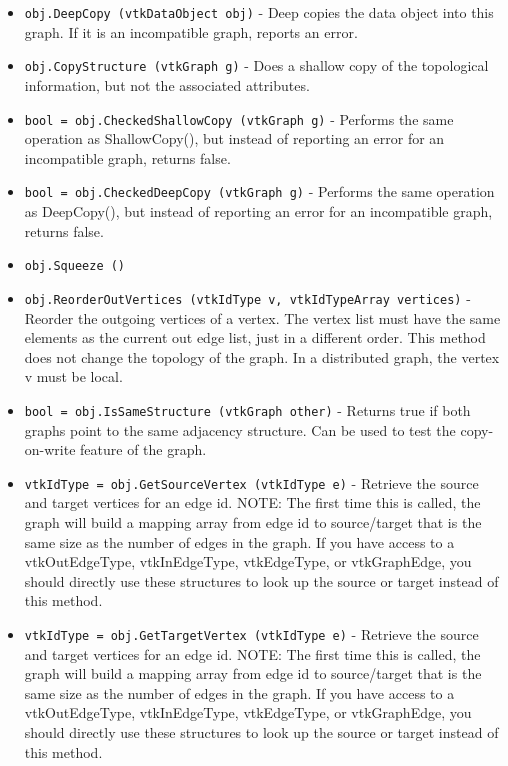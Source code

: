 \begin{itemize}
\item  \verb|obj.DeepCopy (vtkDataObject obj)| -  Deep copies the data object into this graph.
 If it is an incompatible graph, reports an error.

\item  \verb|obj.CopyStructure (vtkGraph g)| -  Does a shallow copy of the topological information,
 but not the associated attributes.

\item  \verb|bool = obj.CheckedShallowCopy (vtkGraph g)| -  Performs the same operation as ShallowCopy(),
 but instead of reporting an error for an incompatible graph,
 returns false.

\item  \verb|bool = obj.CheckedDeepCopy (vtkGraph g)| -  Performs the same operation as DeepCopy(),
 but instead of reporting an error for an incompatible graph,
 returns false.

\item  \verb|obj.Squeeze ()|

\item  \verb|obj.ReorderOutVertices (vtkIdType v, vtkIdTypeArray vertices)| -  Reorder the outgoing vertices of a vertex.
 The vertex list must have the same elements as the current out edge
 list, just in a different order.
 This method does not change the topology of the graph.
 In a distributed graph, the vertex v must be local.

\item  \verb|bool = obj.IsSameStructure (vtkGraph other)| -  Returns true if both graphs point to the same adjacency structure.
 Can be used to test the copy-on-write feature of the graph.

\item  \verb|vtkIdType = obj.GetSourceVertex (vtkIdType e)| -  Retrieve the source and target vertices for an edge id.
 NOTE: The first time this is called, the graph will build
 a mapping array from edge id to source/target that is the
 same size as the number of edges in the graph. If you have
 access to a vtkOutEdgeType, vtkInEdgeType, vtkEdgeType, or
 vtkGraphEdge, you should directly use these structures
 to look up the source or target instead of this method.

\item  \verb|vtkIdType = obj.GetTargetVertex (vtkIdType e)| -  Retrieve the source and target vertices for an edge id.
 NOTE: The first time this is called, the graph will build
 a mapping array from edge id to source/target that is the
 same size as the number of edges in the graph. If you have
 access to a vtkOutEdgeType, vtkInEdgeType, vtkEdgeType, or
 vtkGraphEdge, you should directly use these structures
 to look up the source or target instead of this method.


\end{itemize}
